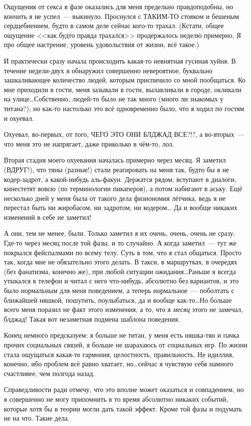 \documentclass[a5paper,12pt,twoside]{memoir}
\begin{document}
\begin{shaded}
Ощущения от секса в фазе оказались для меня предельно правдоподобны, но кончить я не успел~--- выкинуло. Проснулся с ТАКИМ-ТО стояком и бешеным сердцебиением, будто в самом деле сейчас кого-то трахал. (Кстати, общее ощущение <<как будто правда трахался>> продержалось неделю примерно. Я про общее настрение, уровень удовольствия от жизни, всё такое.)

И практически сразу начала происходить какая-то невнятная гусиная хуйня. В течение недели-двух я обнаружил совершенно невероятное, буквально зашкаливающее количество людей, которым приспичило со мной пообщаться. Ко мне приходили в гости, меня зазывали в гости, вылавливали в городе, окликали на улице\ldots Собственно, людей-то было не так много (много ли знакомых у титана?), но как-то настолько это всё одновременно было, что я ходил по гостям и охуевал. 

Охуевал, во-первых, от того, ЧЕГО ЭТО ОНИ БЛДЖАД ВСЕ?!?, а во-вторых~--- что меня это не напрягает, даже приколько в чём-то, лол.

Вторая стадия моего охуевания началась примерно через месяц. Я заметил (ВДРУГ!), что тяны (разные!) стали реагировать на меня так, будто бы я не кодер-задрот, а какой-нибудь аль-факун. Держатся рядом, вступают в диалоги, кинестетят вовсю (по терминологии пикаперов), а потом набигают в аську. Ещё несколько дней у меня была от такого дела физиономия лётчика, ведь я не перестал быть ни жиробасом, ни задротом, ни кодером… Да и вообще никаких изменений в себе не заметил!

А они, тем не менее, были. Только заметил я их очень, очень, очень не сразу. Где-то через месяц после той фазы, и то случайно. А когда заметил~--- тут же покрылся фейспалмами по всему телу. Суть в том, что я стал общаться. Просто так, когда мне не обязательно этого делать. В такси, в маршрутках, в очередях (без фанатизма, конечно же), при любой ситуации ожидания\ldots Раньше я всегда утыкался в телефон и читал с него что-нибудь, абсолютно без вариантов, и это было нормальным для меня поведением, а теперь нормальное~--- поболтать с ближайшей няшкой, пошутить, поулыбаться, да и вообще как-то\ldots Но больше всего меня поразил не факт этого изменения, а то, что я \textit{месяц} этого не замечал, блджад! Такая вот незаметная подмена шаблона поведения.

Конец немного предсказуем: я больше не титан, у меня есть няшка-тян и пачка прочих социальных связей, я больше не шарахаюсь от социальных игр. По жизни стала ощущаться какая-то гармония, целостность, правильность. Не идиллия, конечно, ибо проблем всё равно хватает, но\ldots сейчас я чувствую себя намного счастливее, чем полгода назад.

Справедливости ради отмечу, что это вполне может оказаться и совпадением, но я совершенно не могу припомнить в то время абсолютно никаких событий, которые хотя бы в теории могли дать такой эффект. Кроме той фазы и подумать не на что. Такие дела.
\end{shaded}
\end{document}
